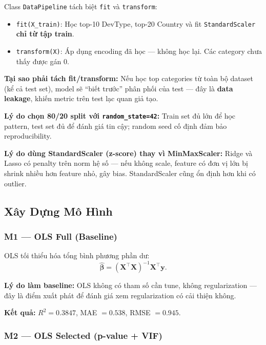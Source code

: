 Class \texttt{DataPipeline} tách biệt \texttt{fit} và \texttt{transform}:

\begin{itemize}
    \item \texttt{fit(X\_train)}: Học top-10 DevType, top-20 Country và fit
        \texttt{StandardScaler} \textbf{chỉ từ tập train}.
    \item \texttt{transform(X)}: Áp dụng encoding đã học — không học lại.
        Các category chưa thấy được gán 0.
\end{itemize}

\noindent\textbf{Tại sao phải tách fit/transform:} Nếu học top categories từ toàn bộ
dataset (kể cả test set), model sẽ ``biết trước'' phân phối của test — đây là
\textbf{data leakage}, khiến metric trên test lạc quan giả tạo.

\noindent\textbf{Lý do chọn 80/20 split với \texttt{random\_state=42}:} Train set đủ lớn để
học pattern, test set đủ để đánh giá tin cậy; random seed cố định đảm bảo
reproducibility.

\noindent\textbf{Lý do dùng StandardScaler (z-score) thay vì MinMaxScaler:} Ridge và Lasso
có penalty trên norm hệ số — nếu không scale, feature có đơn vị lớn bị shrink nhiều hơn
feature nhỏ, gây bias. StandardScaler cũng ổn định hơn khi có outlier.

\subsection{Xây Dựng Mô Hình}

\subsubsection{M1 — OLS Full (Baseline)}

OLS tối thiểu hóa tổng bình phương phần dư:
\begin{equation}
    \hat{\boldsymbol{\beta}} = (\mathbf{X}^\top\mathbf{X})^{-1}\mathbf{X}^\top\mathbf{y}.
\end{equation}

\noindent\textbf{Lý do làm baseline:} OLS không có tham số cần tune, không regularization —
đây là điểm xuất phát để đánh giá xem regularization có cải thiện không.

\noindent\textbf{Kết quả:} $R^2 = 0.3847$, MAE $= 0.538$, RMSE $= 0.945$.

\subsubsection{M2 — OLS Selected (p-value + VIF)}

